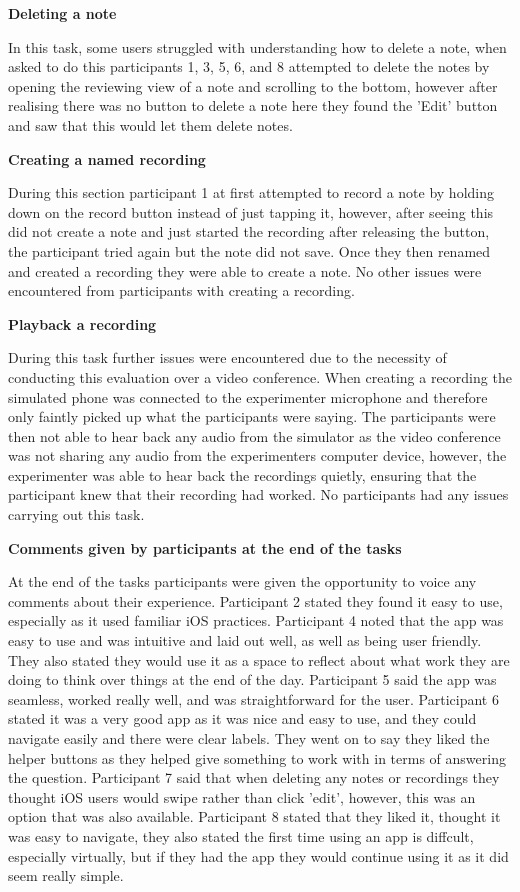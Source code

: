 \documentclass{l4proj}
\begin{document}
\textbf{Deleting a note}
 
In this task, some users struggled with understanding how to delete a note, when asked to do this participants 1, 3, 5, 6, and 8 attempted to delete the notes by opening the reviewing view of a note and scrolling to the bottom, however after realising there was no button to delete a note here they found the 'Edit' button and saw that this would let them delete notes. 

\textbf{Creating a named recording}

During this section participant 1 at first attempted to record a note by holding down on the record button instead of just tapping it, however, after seeing this did not create a note and just started the recording after releasing the button, the participant tried again but the note did not save. Once they then renamed and created a recording they were able to create a note. No other issues were encountered from participants with creating a recording.

\textbf{Playback a recording}

During this task further issues were encountered due to the necessity of conducting this evaluation over a video conference. When creating a recording the simulated phone was connected to the experimenter microphone and therefore only faintly picked up what the participants were saying. The participants were then not able to hear back any audio from the simulator as the video conference was not sharing any audio from the experimenters computer device, however, the experimenter was able to hear back the recordings quietly, ensuring that the participant knew that their recording had worked. No participants had any issues carrying out this task.

\textbf{Comments given by participants at the end of the tasks}

At the end of the tasks participants were given the opportunity to voice any comments about their experience. Participant 2 stated they found it easy to use, especially as it used familiar iOS practices. Participant 4 noted that the app was easy to use and was intuitive and laid out well, as well as being user friendly. They also stated they would use it as a space to reflect about what work they are doing to think over things at the end of the day. Participant 5 said the app was seamless, worked really well, and was straightforward for the user. Participant 6 stated it was a very good app as it was nice and easy to use, and they could navigate easily and there were clear labels. They went on to say they liked the helper buttons as they helped give something to work with in terms of answering the question. Participant 7 said that when deleting any notes or recordings they thought iOS users would swipe rather than click 'edit', however, this was an option that was also available. Participant 8 stated that they liked it, thought it was easy to navigate, they also stated the first time using an app is diffcult, especially virtually, but if they had the app they would continue using it as it did seem really simple.
\end{document}
